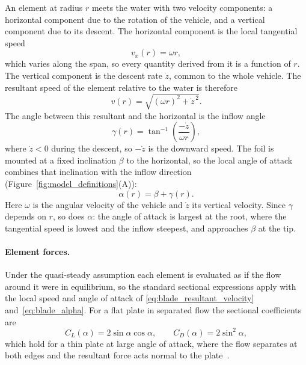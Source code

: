 An element at radius $r$ meets the water with two velocity components: a
horizontal component due to the rotation of the vehicle, and a vertical
component due to its descent.  The horizontal component is the local
tangential speed
%
\begin{equation}
    v_x(r) = \omega r ,
    \label{eq:blade_tangential_velocity}
\end{equation}
%
which varies along the span, so every quantity derived from it is a function of
$r$.  The vertical component is the descent rate $\dot{z}$, common to the whole
vehicle.  The resultant speed of the element relative to the water is therefore
%
\begin{equation}
    v(r) = \sqrt{(\omega r)^2 + \dot{z}^{\,2}} .
    \label{eq:blade_resultant_velocity}
\end{equation}
%
The angle between this resultant and the horizontal is the inflow angle
%
\begin{equation}
    \gamma(r) = \tan^{-1}\!\left(\frac{-\dot{z}}{\omega r}\right),
    \label{eq:blade_gamma}
\end{equation}
%
where $\dot{z}<0$ during the descent, so $-\dot{z}$ is the downward speed.  The
foil is mounted at a fixed inclination $\beta$ to the horizontal, so the local
angle of attack combines that inclination with the inflow direction
(Figure~\ref{fig:model_definitions}(A)):
%
\begin{equation}
    \alpha(r) = \beta + \gamma(r) .
    \label{eq:blade_alpha}
\end{equation}
%
Here $\omega$ is the angular velocity of the vehicle and $\dot{z}$ its vertical
velocity.  Since $\gamma$ depends on $r$, so does $\alpha$: the angle of attack
is largest at the root, where the tangential speed is lowest and the inflow
steepest, and approaches $\beta$ at the tip.

\paragraph{Element forces.}
Under the quasi-steady assumption each element is evaluated as if the flow
around it were in equilibrium, so the standard sectional expressions apply with
the local speed and angle of attack of \eqref{eq:blade_resultant_velocity}
and~\eqref{eq:blade_alpha}.  For a flat plate in separated flow the sectional
coefficients are
%
\begin{equation}
    C_L(\alpha) = 2 \sin{\alpha}\cos{\alpha},
    \qquad
    C_D(\alpha) = 2 \sin^2{\alpha},
    \label{eq:flat_plate_coeffs}
\end{equation}
%
which hold for a thin plate at large angle of attack, where the flow separates
at both edges and the resultant force acts normal to the
plate~\cite{bocquet2003physics,truscott2014water}.

